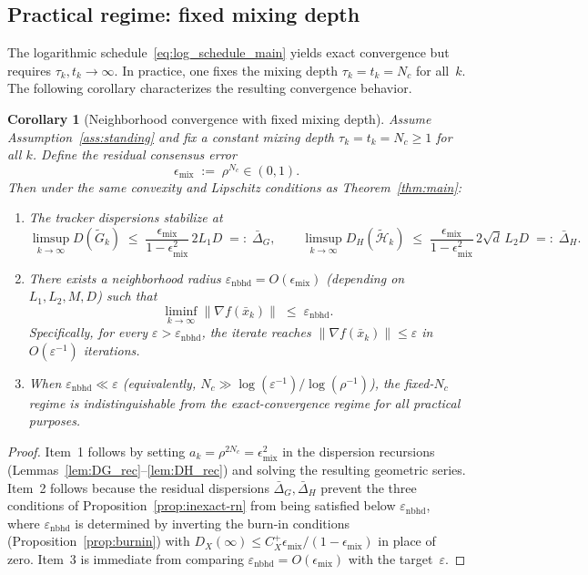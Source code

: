 \documentclass[11pt,a4paper]{article}
\def\cO{O}%
\newtheorem{corollary}[theorem]{Corollary}
\newcommand{\cO}{\mathcal{O}}
\begin{document}
\subsection{Practical regime: fixed mixing depth}\label{ssec:fixed_nc}

The logarithmic schedule~\eqref{eq:log_schedule_main} yields exact convergence but requires
$\tau_k,t_k\to\infty$.
In practice, one fixes the mixing depth $\tau_k=t_k=N_c$ for all~$k$.
The following corollary characterizes the resulting convergence behavior.

\begin{corollary}[Neighborhood convergence with fixed mixing depth]\label{cor:fixed_nc}
Assume Assumption~\ref{ass:standing} and fix a constant mixing depth $\tau_k=t_k=N_c\ge 1$ for all $k$.
Define the residual consensus error
\[
\epsilon_{\mathrm{mix}} \;:=\; \rho^{N_c}\in(0,1).
\]
Then under the same convexity and Lipschitz conditions as Theorem~\ref{thm:main}:
\begin{enumerate}[leftmargin=1.2em,itemsep=2pt]
\item The tracker dispersions stabilize at
\[
\limsup_{k\to\infty} D(\tilde G_k)
\;\le\; \frac{\epsilon_{\mathrm{mix}}}{1-\epsilon_{\mathrm{mix}}^2}\,2L_1D
\;=:\; \bar\Delta_G,
\qquad
\limsup_{k\to\infty} D_H(\tilde{\mathcal H}_k)
\;\le\; \frac{\epsilon_{\mathrm{mix}}}{1-\epsilon_{\mathrm{mix}}^2}\,2\sqrt{d}\,L_2D
\;=:\; \bar\Delta_H.
\]
\item There exists a neighborhood radius $\varepsilon_{\mathrm{nbhd}}=\cO(\epsilon_{\mathrm{mix}})$
(depending on $L_1,L_2,M,D$) such that
\[
\liminf_{k\to\infty}\|\nabla f(\bar x_k)\|\;\le\; \varepsilon_{\mathrm{nbhd}}.
\]
Specifically, for every $\varepsilon>\varepsilon_{\mathrm{nbhd}}$, the iterate reaches
$\|\nabla f(\bar x_k)\|\le \varepsilon$ in $\cO(\varepsilon^{-1})$ iterations.
\item When $\varepsilon_{\mathrm{nbhd}}\ll\varepsilon$
(equivalently, $N_c\gg \log(\varepsilon^{-1})/\log(\rho^{-1})$),
the fixed-$N_c$ regime is indistinguishable from the exact-convergence regime
for all practical purposes.
\end{enumerate}
\end{corollary}

\begin{proof}
Item~1 follows by setting $a_k=\rho^{2N_c}=\epsilon_{\mathrm{mix}}^2$ in the
dispersion recursions (Lemmas~\ref{lem:DG_rec}--\ref{lem:DH_rec}) and solving the
resulting geometric series.
Item~2 follows because the residual dispersions $\bar\Delta_G, \bar\Delta_H$
prevent the three conditions of Proposition~\ref{prop:inexact-rn} from being
satisfied below $\varepsilon_{\mathrm{nbhd}}$,
where $\varepsilon_{\mathrm{nbhd}}$ is determined by inverting the burn-in
conditions (Proposition~\ref{prop:burnin}) with
$D_X(\infty)\le C_X^{+}\epsilon_{\mathrm{mix}}/(1-\epsilon_{\mathrm{mix}})$
in place of zero.
Item~3 is immediate from comparing $\varepsilon_{\mathrm{nbhd}}=\cO(\epsilon_{\mathrm{mix}})$
with the target~$\varepsilon$.
\end{proof}
\end{document}
